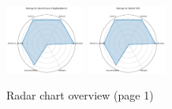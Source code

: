 \documentclass{article}
\begin{document}
\begin{figure}[ht!]
\includegraphics[width=0.2333\textwidth]{BenchCouncil BigDataBench_radar.pdf}
\includegraphics[width=0.2333\textwidth]{MLPerf HPC_radar.pdf}
\\[1ex]
\caption{Radar chart overview (page 1)}
\end{figure}


\clearpage
\end{document}
